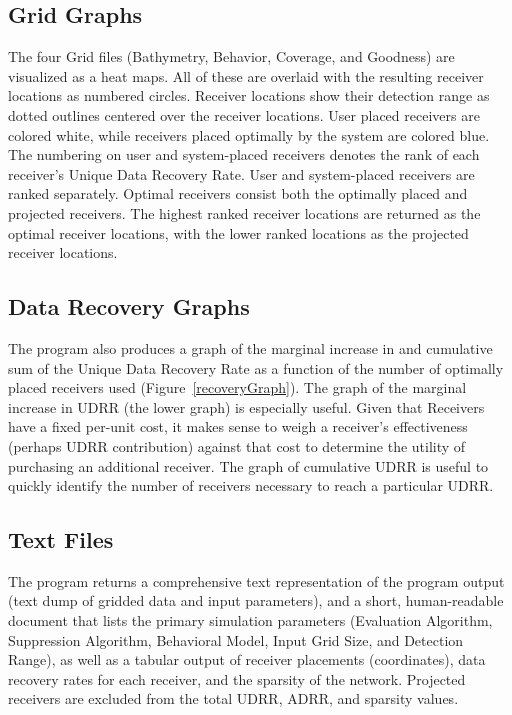 \subsection{Grid Graphs}
The four Grid files (Bathymetry, Behavior, Coverage, and Goodness) are visualized as a heat maps.  All of these are overlaid with the resulting receiver locations as numbered circles.  Receiver locations show their detection range as dotted outlines centered over the receiver locations.  User placed receivers are colored white, while receivers placed optimally by the system are colored blue.  The numbering on user and system-placed receivers denotes the rank of each receiver's Unique Data Recovery Rate.  User and system-placed receivers are ranked separately.  Optimal receivers consist both the optimally placed and projected receivers.  The highest ranked receiver locations are returned as the optimal receiver locations, with the lower ranked locations as the projected receiver locations.


\subsection{Data Recovery Graphs}
The program also produces a graph of the marginal increase in and cumulative sum of the Unique Data Recovery Rate as a function of the number of optimally placed receivers used (Figure~\ref{recoveryGraph}).  The graph of the marginal increase in UDRR (the lower graph) is especially useful.  Given that Receivers have a fixed per-unit cost, it makes sense to weigh a receiver's effectiveness (perhaps UDRR contribution) against that cost to determine the utility of purchasing an additional receiver.  The graph of cumulative UDRR is useful to quickly identify the number of receivers necessary to reach a particular UDRR.

\subsection{Text Files}
The program returns a comprehensive text representation of the program output (text dump of gridded data and input parameters), and a short, human-readable document that lists the primary simulation parameters (Evaluation Algorithm, Suppression Algorithm, Behavioral Model, Input Grid Size, and Detection Range), as well as a tabular output of receiver placements (coordinates), data recovery rates for each receiver, and the sparsity of the network.  Projected receivers are excluded from the total UDRR, ADRR, and sparsity values.

